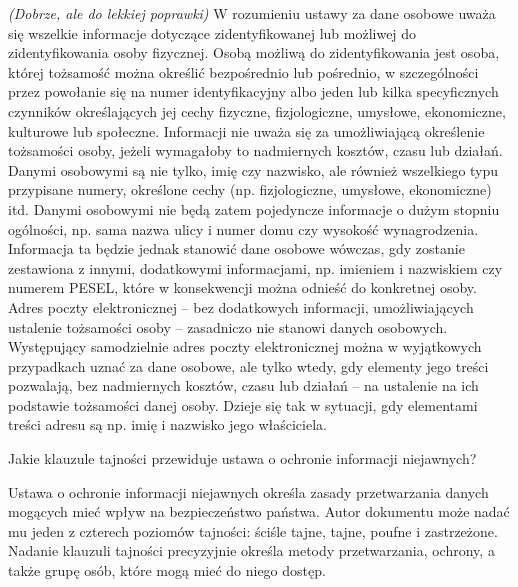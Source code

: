 \documentclass[answers,11pt]{exam}
\newcommand{\fixit}{\textit{(Dobrze, ale do lekkiej poprawki)} }
\begin{document}
\begin{questions}
\begin{solution}
\fixit
W rozumieniu ustawy za dane osobowe uważa się wszelkie informacje dotyczące zidentyfikowanej lub możliwej do zidentyfikowania osoby fizycznej. Osobą możliwą do zidentyfikowania jest osoba, której tożsamość można określić bezpośrednio lub pośrednio, w szczególności przez powołanie się na numer identyfikacyjny albo jeden lub kilka specyficznych czynników określających jej cechy fizyczne, fizjologiczne, umysłowe, ekonomiczne, kulturowe lub społeczne. Informacji nie uważa się za umożliwiającą określenie tożsamości osoby, jeżeli wymagałoby to nadmiernych kosztów, czasu lub działań. Danymi osobowymi są nie tylko, imię czy nazwisko, ale również wszelkiego typu przypisane numery, określone cechy (np. fizjologiczne, umysłowe, ekonomiczne) itd. Danymi osobowymi nie będą zatem pojedyncze informacje o dużym stopniu ogólności, np. sama nazwa ulicy i numer domu czy wysokość wynagrodzenia. Informacja ta będzie jednak stanowić dane osobowe wówczas, gdy zostanie zestawiona z innymi, dodatkowymi informacjami, np. imieniem i nazwiskiem czy numerem PESEL, które w konsekwencji można odnieść do konkretnej osoby. Adres poczty elektronicznej – bez dodatkowych informacji, umożliwiających ustalenie tożsamości osoby – zasadniczo nie stanowi danych osobowych. Występujący samodzielnie adres poczty elektronicznej można w wyjątkowych przypadkach uznać za dane osobowe, ale tylko wtedy, gdy elementy jego treści pozwalają, bez nadmiernych kosztów, czasu lub działań – na ustalenie na ich podstawie tożsamości danej osoby. Dzieje się tak w sytuacji, gdy elementami treści adresu są np. imię i nazwisko jego właściciela.

\end{solution}


\question Jakie klauzule tajności przewiduje ustawa o ochronie informacji niejawnych?
\begin{solution}
Ustawa o ochronie informacji niejawnych określa zasady przetwarzania danych mogących mieć wpływ na bezpieczeństwo państwa. Autor dokumentu może nadać mu jeden z czterech poziomów tajności: ściśle tajne, tajne, poufne i zastrzeżone. Nadanie klauzuli tajności precyzyjnie określa metody przetwarzania, ochrony, a także grupę osób, które mogą mieć do niego dostęp. 
\end{solution}



\end{questions}
\end{document}
